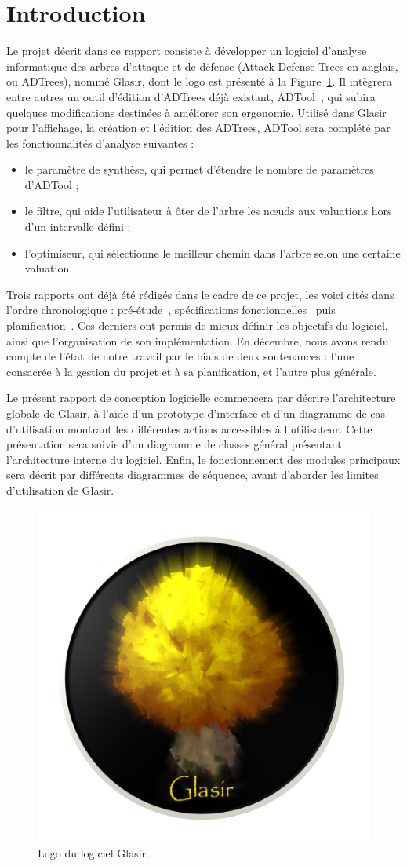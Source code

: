 \section{Introduction}
    \label{sec:intro}

    Le projet décrit dans ce rapport consiste à développer un logiciel d'analyse informatique des arbres d'attaque et de défense (\og Attack-Defense Trees \fg{} en anglais, ou ADTrees), nommé Glasir, dont le logo est présenté à la {\sc Figure}~\ref{fig:glasir}. Il intègrera entre autres un outil d'édition d'ADTrees déjà existant, ADTool~\cite{ADTool}, qui subira quelques modifications destinées à améliorer son ergonomie. Utilisé dans Glasir pour l'affichage, la création et l'édition des ADTrees, ADTool sera complété par les fonctionnalités d'analyse suivantes :

    \begin{itemize}
    	\item le paramètre de synthèse, qui permet d'étendre le nombre de paramètres d'ADTool ;
    	\item le filtre, qui aide l'utilisateur à ôter de l’arbre les nœuds aux valuations hors d'un intervalle défini ;
    	\item l'optimiseur, qui sélectionne le meilleur chemin dans l'arbre selon une certaine valuation.
    \end{itemize} 

    Trois rapports ont déjà été rédigés dans le cadre de ce projet, les voici cités dans l'ordre chronologique : pré-étude~\cite{pre_etude}, spécifications fonctionnelles~\cite{spec_fonc} puis planification~\cite{planif}. Ces derniers ont permis de mieux définir les objectifs du logiciel, ainsi que l'organisation de son implémentation. En décembre, nous avons rendu compte de l'état de notre travail par le biais de deux soutenances : l'une consacrée à la gestion du projet et à sa planification, et l'autre plus générale. 

    Le présent rapport de conception logicielle commencera par décrire l'architecture globale de Glasir, à l'aide d'un prototype d'interface et d'un diagramme de cas d'utilisation montrant les différentes actions accessibles à l'utilisateur. Cette présentation sera suivie d'un diagramme de classes général présentant l'architecture interne du logiciel. Enfin, le fonctionnement des modules principaux sera décrit par différents diagrammes de séquence, avant d'aborder les limites d'utilisation de Glasir.

    \vspace{10mm}

    \begin{figure}[H]
        \centering
        \includegraphics[height=0.5\textwidth]{figure/glasir.png}
        \caption{Logo du logiciel Glasir.}
        \label{fig:glasir}
    \end{figure}
